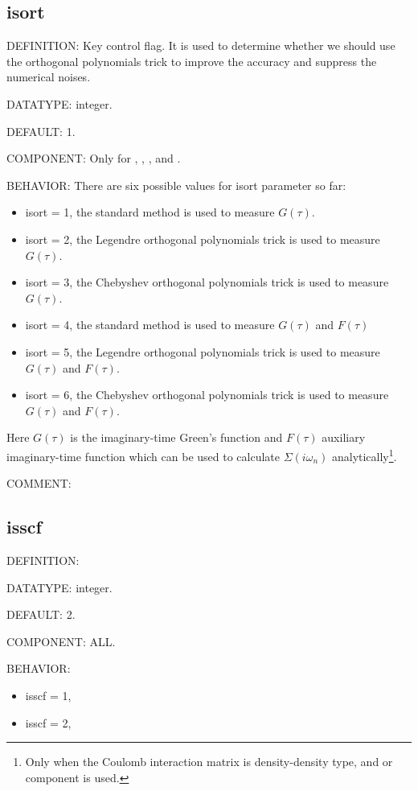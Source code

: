 \subsection{isort}
{\color{red}DEFINITION:} Key control flag. It is used to determine whether we should use the orthogonal polynomials trick to improve the accuracy and suppress the numerical noises.

{\color{green}DATATYPE:} integer.

{\color{blue}DEFAULT:} 1.

{\color{brown}COMPONENT:} Only for {\gardenia}, {\narcissus}, {\lavender}, and {\manjushaka}.

{\color{purple}BEHAVIOR:} There are six possible values for isort parameter so far:
\begin{itemize}
\item isort = 1, the standard method is used to measure $G(\tau)$.
\item isort = 2, the Legendre orthogonal polynomials trick is used to measure $G(\tau)$.
\item isort = 3, the Chebyshev orthogonal polynomials trick is used to measure $G(\tau)$.
\item isort = 4, the standard method is used to measure $G(\tau)$ and $F(\tau)$
\item isort = 5, the Legendre orthogonal polynomials trick is used to measure $G(\tau)$ and $F(\tau)$.
\item isort = 6, the Chebyshev orthogonal polynomials trick is used to measure $G(\tau)$ and $F(\tau)$.
\end{itemize}
Here $G(\tau)$ is the imaginary-time Green's function and $F(\tau)$ auxiliary imaginary-time function which can be used to calculate $\Sigma(i\omega_n)$ analytically\footnote{Only when the Coulomb interaction matrix is density-density type, and {\gardenia} or {\narcissus} component is used.}.

{\color{olive}COMMENT:}

\subsection{isscf}
{\color{red}DEFINITION:}

{\color{green}DATATYPE:} integer.

{\color{blue}DEFAULT:} 2.

{\color{brown}COMPONENT:} ALL.

{\color{purple}BEHAVIOR:}
\begin{itemize}
\item isscf = 1,
\item isscf = 2,
\end{itemize}


